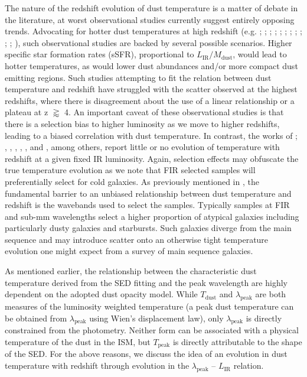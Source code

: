 The nature of the redshift evolution of dust temperature is a matter of debate in the literature, at worst observational studies currently suggest entirely opposing trends. Advocating for hotter dust temperatures at high redshift (e.g. \citealt{Magdis_2012}; \citealt{Magnelli_2014}; \citealt{Swinbank_2014}; \citealt{Bethermin_2015}; \citealt{Faisst_2017}; \citealt{Schreiber_2018}; \citealt{Zavala_2018b}; \citealt{Liang_2019}; \citealt{Ma_2019}; \citealt{Faisst_2020}; \citealt{Bakx_2021}; \citealt{Witstok_2023}), such observational studies are backed by several possible scenarios. Higher specific star formation rates (sSFR), proportional to $L_{\textrm{IR}}/M_{\textrm{dust}}$, would lead to hotter temperatures, as would lower dust abundances and/or more compact dust emitting regions. Such studies attempting to fit the relation between dust temperature and redshift have struggled with the scatter observed at the highest redshifts, where there is disagreement about the use of a linear relationship or a plateau at z $\gtrapprox$ 4. An important caveat of these observational studies is that there is a selection bias to higher luminosity as we move to higher redshifts, leading to a biased correlation with dust temperature. In contrast, the works of \citealt{Casey_2018}; \citealt{Jin_2019}, \citealt{Lim_2020a}, \citealt{Dudzeviciute_2020}, \citealt{Reuter_2020}, \citealt{Barger_2022}, \citealt{Drew_2022} and \citealt{Witstok_2023}, among others, report little or no evolution of temperature with redshift at a given fixed IR luminosity. Again, selection effects may obfuscate the true temperature evolution as we note that FIR selected samples will preferentially select for cold galaxies. As previously mentioned in \citealt{Bendo_2023}, the fundamental barrier to an unbiased relationship between dust temperature and redshift is the wavebands used to select the samples. Typically samples at FIR and sub-mm wavelengths select a higher proportion of atypical galaxies including particularly dusty galaxies and starbursts. Such galaxies diverge from the main sequence and may introduce scatter onto an otherwise tight temperature evolution one might expect from a survey of main sequence galaxies.

As mentioned earlier, the relationship between the characteristic dust temperature derived from the SED fitting and the peak wavelength are highly dependent on the adopted dust opacity model. While $T_{\textrm{dust}}$ and $\lambda_{\textrm{peak}}$ are both measures of the luminosity weighted temperature (a peak dust temperature can be obtained from $\lambda_{\textrm{peak}}$ using Wien's displacement law), only $\lambda_{\textrm{peak}}$ is directly constrained from the photometry. Neither form can be associated with a physical temperature of the dust in the ISM, but $T_{\textrm{peak}}$ is directly attributable to the shape of the SED. For the above reasons, we discuss the idea of an evolution in dust temperature with redshift through evolution in the $\lambda_{\textrm{peak}}$ -- $L_{\textrm{IR}}$ relation.

